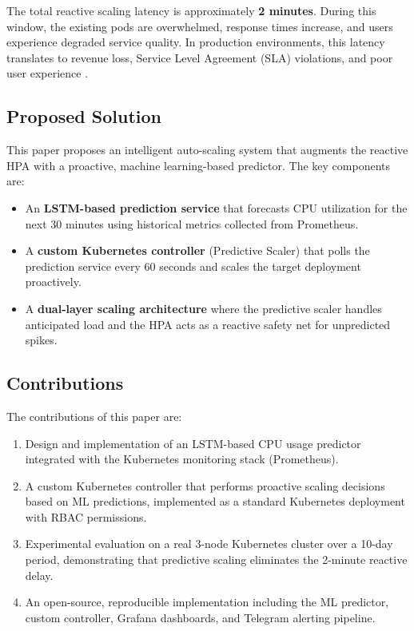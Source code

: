 \documentclass[journal]{IEEEtran}
\begin{document}
The total reactive scaling latency is approximately \textbf{2 minutes}. During this window, the existing pods are overwhelmed, response times increase, and users experience degraded service quality. In production environments, this latency translates to revenue loss, Service Level Agreement (SLA) violations, and poor user experience \cite{mao2016}.

\subsection{Proposed Solution}
This paper proposes an intelligent auto-scaling system that augments the reactive HPA with a proactive, machine learning-based predictor. The key components are:

\begin{itemize}
    \item An \textbf{LSTM-based prediction service} that forecasts CPU utilization for the next 30 minutes using historical metrics collected from Prometheus.
    \item A \textbf{custom Kubernetes controller} (Predictive Scaler) that polls the prediction service every 60 seconds and scales the target deployment proactively.
    \item A \textbf{dual-layer scaling architecture} where the predictive scaler handles anticipated load and the HPA acts as a reactive safety net for unpredicted spikes.
\end{itemize}

\subsection{Contributions}
The contributions of this paper are:
\begin{enumerate}
    \item Design and implementation of an LSTM-based CPU usage predictor integrated with the Kubernetes monitoring stack (Prometheus).
    \item A custom Kubernetes controller that performs proactive scaling decisions based on ML predictions, implemented as a standard Kubernetes deployment with RBAC permissions.
    \item Experimental evaluation on a real 3-node Kubernetes cluster over a 10-day period, demonstrating that predictive scaling eliminates the 2-minute reactive delay.
    \item An open-source, reproducible implementation including the ML predictor, custom controller, Grafana dashboards, and Telegram alerting pipeline.
\end{enumerate}
\end{document}
